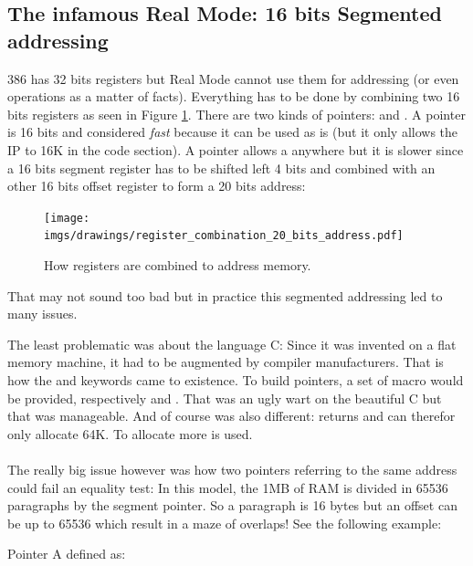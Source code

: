 \documentclass[book.tex]{subfiles}
\begin{document}
\subsection{The infamous Real Mode: 16 bits Segmented addressing}
386 has 32 bits registers but Real Mode cannot use them for addressing (or even operations as a matter of facts). Everything has to be done by combining two 16 bits registers as seen in Figure \ref{fig:register_comb_to_20_bits}. There are two kinds of pointers:  and . A  pointer is 16 bits and considered \emph{fast} because it can be used as is (but it only allows the IP to  16K in the code section). A  pointer allows a  anywhere but it is slower since a 16 bits segment register has to be shifted left 4 bits and combined with an other 16 bits offset register to form a 20 bits address:\\
\begin{figure}[H]
\centering
\texttt{[image: imgs/drawings/register\_combination\_20\_bits\_address.pdf]}
\caption{How registers are combined to address memory.}
\label{fig:register_comb_to_20_bits}
\end{figure}
That may not sound too bad but in practice this segmented addressing led to many issues.\\
\par 
The least problematic was about the language C: Since it was invented on a flat memory machine, it had to be augmented by compiler manufacturers. That is how the  and  keywords came to existence. To build pointers, a set of macro would be provided, respectively  and . That was an ugly wart on the beautiful C but that was manageable. And of course  was also different:  returns  and can therefor only allocate 64K. To allocate more  is used.\\
\\
The really big issue however was how two pointers referring to the same address could fail an equality test: In this model, the 1MB of RAM is divided in 65536 paragraphs by the segment pointer. So a paragraph is 16 bytes but an offset can be up to 65536 which result in a maze of overlaps! See the following example:\\
\par
Pointer A defined as:\\
\par
\begin{minipage}{\textwidth}

\end{minipage}
\end{document}
